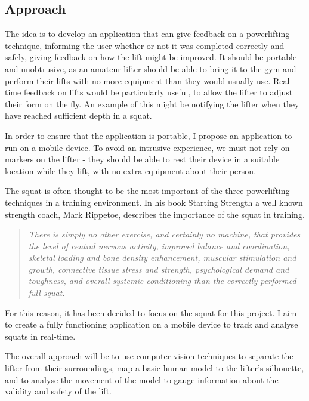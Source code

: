 \subsection{Approach}

The idea is to develop an application that can give feedback on a powerlifting technique, informing the user whether or not it was completed correctly and safely, giving feedback on how the lift might be improved. It should be portable and unobtrusive, as an amateur lifter should be able to bring it to the gym and perform their lifts with no more equipment than they would usually use. Real-time feedback on lifts would be particularly useful, to allow the lifter to adjust their form on the fly. An example of this might be notifying the lifter when they have reached sufficient depth in a squat.

In order to ensure that the application is portable, I propose an application to run on a mobile device. To avoid an intrusive experience, we must not rely on markers on the lifter - they should be able to rest their device in a suitable location while they lift, with no extra equipment about their person.

The squat is often thought to be the most important of the three powerlifting techniques in a training environment. In his book Starting Strength\cite{startingstrength} a well known strength coach, Mark Rippetoe, describes the importance of the squat in training.

\begin{quote}
\emph{There is simply no other exercise, and certainly no machine, that provides the level of central nervous activity, improved balance and coordination, skeletal loading and bone density enhancement, muscular stimulation and growth, connective tissue stress and strength, psychological demand and toughness, and overall systemic conditioning than the correctly performed full squat.}
\end{quote}

For this reason, it has been decided to focus on the squat for this project. I aim to create a fully functioning application on a mobile device to track and analyse squats in real-time.

The overall approach will be to use computer vision techniques to separate the lifter from their surroundings, map a basic human model to the lifter's silhouette, and to analyse the movement of the model to gauge information about the validity and safety of the lift.
